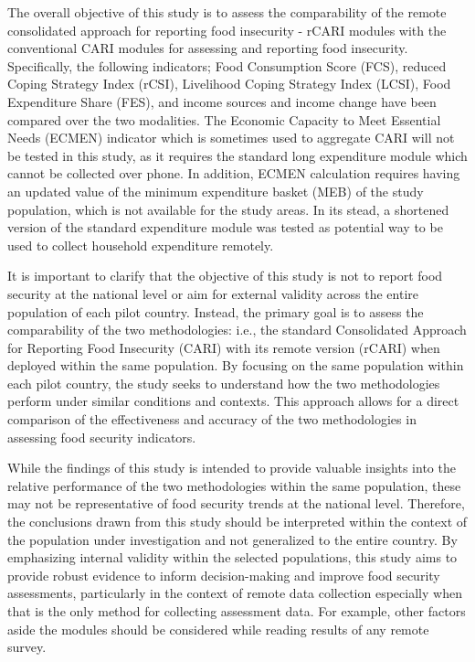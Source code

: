 \documentclass[11pt,harvard]{article}
\begin{document}
	The overall objective of this study is to assess the comparability of the remote consolidated approach for reporting food insecurity - rCARI modules with the conventional CARI modules for assessing and reporting food insecurity. Specifically, the following indicators; Food Consumption Score (FCS), reduced Coping Strategy Index (rCSI), Livelihood Coping Strategy Index (LCSI), Food Expenditure Share (FES), and income sources and income change have been compared over the two modalities. The Economic Capacity to Meet Essential Needs (ECMEN) indicator which is sometimes used to aggregate CARI will not be tested in this study, as it requires the standard long expenditure module which cannot be collected over phone. In addition, ECMEN calculation requires having an updated value of the minimum expenditure basket (MEB) of the study population, which is not available for the study areas. In its stead, a shortened version of the standard expenditure module was tested as potential way to be used to collect household expenditure remotely.
	
	It is important to clarify that the objective of this study is not to report food security at the national level or aim for external validity across the entire population of each pilot country. Instead, the primary goal is to assess the comparability of the two methodologies: i.e., the standard Consolidated Approach for Reporting Food Insecurity (CARI) with its remote version (rCARI) when deployed within the same population. By focusing on the same population within each pilot country, the study seeks to understand how the two methodologies perform under similar conditions and contexts. This approach allows for a direct comparison of the effectiveness and accuracy of the two methodologies in assessing food security indicators.
	
	While the findings of this study is intended to provide valuable insights into the relative performance of the two methodologies within the same population, these may not be representative of food security trends at the national level. Therefore, the conclusions drawn from this study should be interpreted within the context of the population under investigation and not generalized to the entire country. By emphasizing internal validity within the selected populations, this study aims to provide robust evidence to inform decision-making and improve food security assessments, particularly in the context of remote data collection especially when that is the only method for collecting assessment data. For example, other factors aside the modules should be considered while reading results of any remote survey.
	
\end{document}
